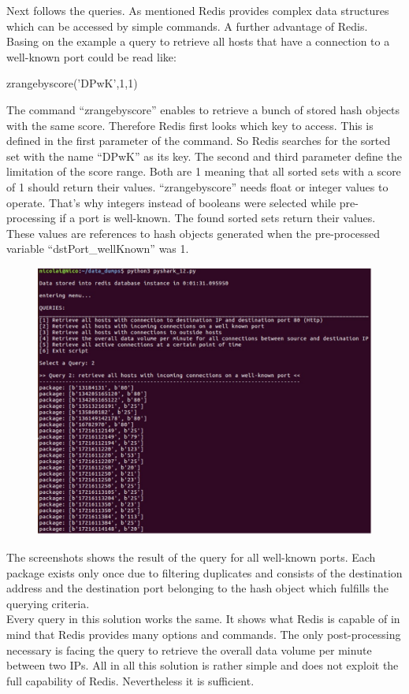 Next follows the queries. As mentioned Redis provides complex data structures which can be accessed by simple commands. A further advantage of Redis. Basing on the example a query to retrieve all hosts that have a connection to a well-known port could be read like:\\

\begin{center}
zrangebyscore('DPwK',1,1)\\
\end{center}

The command “zrangebyscore” enables to retrieve a bunch of stored hash objects with the same score. Therefore Redis first looks which key to access. This is defined in the first parameter of the command. So Redis searches for the sorted set with the name “DPwK” as its key. The second and third parameter define the limitation of the score range. Both are 1 meaning that all sorted sets with a score of 1 should return their values. “zrangebyscore” needs float or integer values to operate. That’s why integers instead of booleans were selected while pre-processing if a port is well-known. The found sorted sets return their values. These values are references to hash objects generated when the pre-processed variable “dstPort_wellKnown” was 1. 

\begin{figure}[H]
	\centerline{\includegraphics[width=1.0\textwidth]{resources/solution3-3.png}}
\end{figure}

The screenshots shows the result of the query for all well-known ports. Each package exists only once due to filtering duplicates and consists of the destination address and the destination port belonging to the hash object which fulfills the querying criteria.\\
Every query in this solution works the same. It shows what Redis is capable of in mind that Redis provides many options and commands. The only post-processing necessary is facing the query to retrieve the overall data volume per minute between two IPs. All in all this solution is rather simple and does not exploit the full capability of Redis. Nevertheless it is sufficient.
